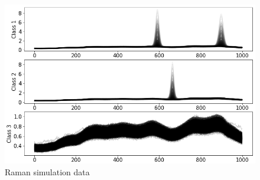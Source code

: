 \documentclass{article}
\begin{document}
\begin{figure}[!h]
	\centering
	\includegraphics[width=1\linewidth]{figures_3/raman_sim_training_data_2.png}  
	\caption{Raman simulation data}
\end{figure}
\end{document}
